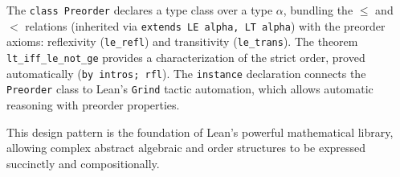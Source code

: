   The \texttt{class Preorder} declares a type class over a type 
 \(\alpha\), bundling the \(\leq\) and \(<\) relations 
 (inherited via \texttt{extends LE alpha, LT alpha}) with the
  preorder axioms: reflexivity (\texttt{le\_refl}) and 
  transitivity (\texttt{le\_trans}).
  The theorem \texttt{lt\_iff\_le\_not\_ge} provides a characterization of the strict order, 
  proved automatically (\texttt{by intros; rfl}).
  The \texttt{instance} declaration connects the \texttt{Preorder} class to Lean’s \texttt{Grind} 
  tactic automation, which allows automatic reasoning with preorder properties.

This design pattern is the foundation of Lean’s powerful mathematical library, 
allowing complex abstract algebraic and order structures to be expressed succinctly and compositionally.


